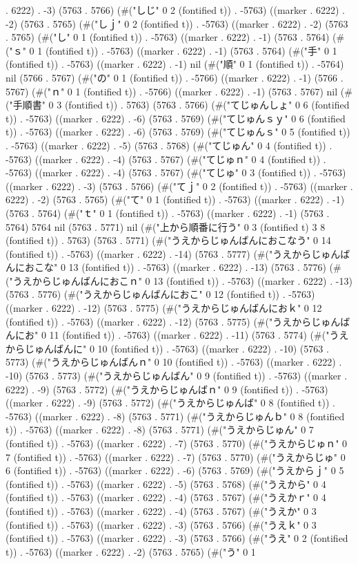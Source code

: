 {. 6222) . -3) (5763 . 5766) (#("しじ" 0 2 (fontified t)) . -5763) ((marker . 6222) . -2) (5763 . 5765) (#("しｊ" 0 2 (fontified t)) . -5763) ((marker . 6222) . -2) (5763 . 5765) (#("し" 0 1 (fontified t)) . -5763) ((marker . 6222) . -1) (5763 . 5764) (#("ｓ" 0 1 (fontified t)) . -5763) ((marker . 6222) . -1) (5763 . 5764) (#("手" 0 1 (fontified t)) . -5763) ((marker . 6222) . -1) nil (#("順" 0 1 (fontified t)) . -5764) nil (5766 . 5767) (#("の" 0 1 (fontified t)) . -5766) ((marker . 6222) . -1) (5766 . 5767) (#("ｎ" 0 1 (fontified t)) . -5766) ((marker . 6222) . -1) (5763 . 5767) nil (#("手順書" 0 3 (fontified t)) . 5763) (5763 . 5766) (#("てじゅんしょ" 0 6 (fontified t)) . -5763) ((marker . 6222) . -6) (5763 . 5769) (#("てじゅんｓｙ" 0 6 (fontified t)) . -5763) ((marker . 6222) . -6) (5763 . 5769) (#("てじゅんｓ" 0 5 (fontified t)) . -5763) ((marker . 6222) . -5) (5763 . 5768) (#("てじゅん" 0 4 (fontified t)) . -5763) ((marker . 6222) . -4) (5763 . 5767) (#("てじゅｎ" 0 4 (fontified t)) . -5763) ((marker . 6222) . -4) (5763 . 5767) (#("てじゅ" 0 3 (fontified t)) . -5763) ((marker . 6222) . -3) (5763 . 5766) (#("てｊ" 0 2 (fontified t)) . -5763) ((marker . 6222) . -2) (5763 . 5765) (#("て" 0 1 (fontified t)) . -5763) ((marker . 6222) . -1) (5763 . 5764) (#("ｔ" 0 1 (fontified t)) . -5763) ((marker . 6222) . -1) (5763 . 5764) 5764 nil (5763 . 5771) nil (#("上から順番に行う" 0 3 (fontified t) 3 8 (fontified t)) . 5763) (5763 . 5771) (#("うえからじゅんばんにおこなう" 0 14 (fontified t)) . -5763) ((marker . 6222) . -14) (5763 . 5777) (#("うえからじゅんばんにおこな" 0 13 (fontified t)) . -5763) ((marker . 6222) . -13) (5763 . 5776) (#("うえからじゅんばんにおこｎ" 0 13 (fontified t)) . -5763) ((marker . 6222) . -13) (5763 . 5776) (#("うえからじゅんばんにおこ" 0 12 (fontified t)) . -5763) ((marker . 6222) . -12) (5763 . 5775) (#("うえからじゅんばんにおｋ" 0 12 (fontified t)) . -5763) ((marker . 6222) . -12) (5763 . 5775) (#("うえからじゅんばんにお" 0 11 (fontified t)) . -5763) ((marker . 6222) . -11) (5763 . 5774) (#("うえからじゅんばんに" 0 10 (fontified t)) . -5763) ((marker . 6222) . -10) (5763 . 5773) (#("うえからじゅんばんｎ" 0 10 (fontified t)) . -5763) ((marker . 6222) . -10) (5763 . 5773) (#("うえからじゅんばん" 0 9 (fontified t)) . -5763) ((marker . 6222) . -9) (5763 . 5772) (#("うえからじゅんばｎ" 0 9 (fontified t)) . -5763) ((marker . 6222) . -9) (5763 . 5772) (#("うえからじゅんば" 0 8 (fontified t)) . -5763) ((marker . 6222) . -8) (5763 . 5771) (#("うえからじゅんｂ" 0 8 (fontified t)) . -5763) ((marker . 6222) . -8) (5763 . 5771) (#("うえからじゅん" 0 7 (fontified t)) . -5763) ((marker . 6222) . -7) (5763 . 5770) (#("うえからじゅｎ" 0 7 (fontified t)) . -5763) ((marker . 6222) . -7) (5763 . 5770) (#("うえからじゅ" 0 6 (fontified t)) . -5763) ((marker . 6222) . -6) (5763 . 5769) (#("うえからｊ" 0 5 (fontified t)) . -5763) ((marker . 6222) . -5) (5763 . 5768) (#("うえから" 0 4 (fontified t)) . -5763) ((marker . 6222) . -4) (5763 . 5767) (#("うえかｒ" 0 4 (fontified t)) . -5763) ((marker . 6222) . -4) (5763 . 5767) (#("うえか" 0 3 (fontified t)) . -5763) ((marker . 6222) . -3) (5763 . 5766) (#("うえｋ" 0 3 (fontified t)) . -5763) ((marker . 6222) . -3) (5763 . 5766) (#("うえ" 0 2 (fontified t)) . -5763) ((marker . 6222) . -2) (5763 . 5765) (#("う" 0 1 }
